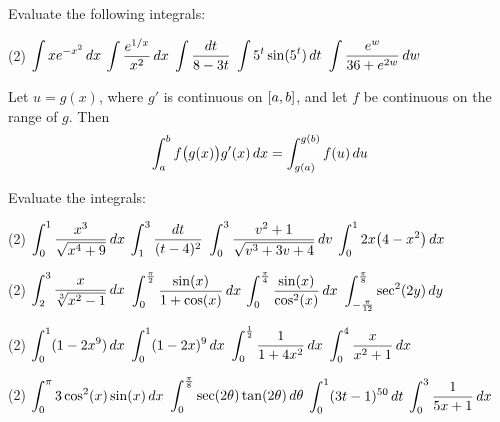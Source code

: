 \documentclass[../mathNotesPreamble]{subfiles}
\begin{document}
  \begin{ex*}
    Evaluate the following integrals:
  \end{ex*}
  \begin{tasks}[after-item-skip=\stretch{1}](2)
    \task $\ds\int xe\inv[x^2]\,dx$
    \task $\ds\int \frac{e^{1/x}}{x^2}\,dx$
    \task $\ds\int \frac{dt}{8-3t}$
    \task $\ds\int 5^t\sin(5^t)\,dt$
    \task $\ds\int \frac{e^w}{36+e^{2w}}\,dw$
  \end{tasks}
  \pagebreak

  \begin{thmBox*}
    Let $u=g(x)$, where $g'$ is continuous on $\sbrkt{a,b}$, and let $f$ be continuous on the range of $g$. Then
      \[\int_a^b f\parens{g(x)\vphantom{g(x)^1}}g'(x)\,dx=\int_{g(a)}^{g(b)}f(u)\,du\]
  \end{thmBox*}

  \begin{ex*}
    Evaluate the integrals:
  \end{ex*}
  \begin{tasks}[after-item-skip=\stretch{1}](2)
    \task $\ds\int_0^1 \frac{x^3}{\sqrt{x^4+9}}\,dx$
    \task $\ds\int_1^3 \frac{dt}{(t-4)^2}$
    \task $\ds\int_0^3 \frac{v^2+1}{\sqrt{v^3+3v+4}}\,dv$
    \task $\ds\int_0^1 2x\parens{4-x^2}\,dx$
  \end{tasks}
  \pagebreak
  
  \begin{tasks}[after-item-skip=\stretch{1}, resume](2)
    \task $\ds\int_2^3 \frac{x}{\sqrt[3]{x^2-1}}\,dx$
    \task $\ds\int_{0}^{\frac{\pi}{2}} \frac{\sin(x)}{1+\cos(x)}\,dx$
    \task $\ds\int_0^{\frac{\pi}{4}} \frac{\sin(x)}{\cos^2(x)}\,dx$
    \task $\ds\int_{-\frac{\pi}{12}}^{\frac{\pi}{8}} \sec^2(2y)\,dy$
  \end{tasks}
  \pagebreak
  
  \begin{tasks}[after-item-skip=\stretch{1}, resume](2)
    \task $\ds\int_0^1 (1-2x^9)\,dx$
    \task $\ds\int_0^1 (1-2x)^9\,dx$
    \task $\ds\int_0^{\frac{1}{2}} \frac{1}{1+4x^2}\,dx$
    \task $\ds\int_0^4 \frac{x}{x^2+1}\,dx$
  \end{tasks}
  \pagebreak
  
  \begin{tasks}[after-item-skip=\stretch{1}, resume](2)
    \task $\ds\int_0^\pi 3\cos^2(x)\sin(x)\,dx$
    \task $\ds\int_0^{\frac{\pi}{8}} \sec(2\theta)\tan(2\theta)\,d\theta$
    \task $\ds\int_0^1 (3t-1)^{50}\,dt$
    \task $\ds\int_0^3 \frac{1}{5x+1}\,dx$
  \end{tasks}
  \pagebreak
  
\end{document}

